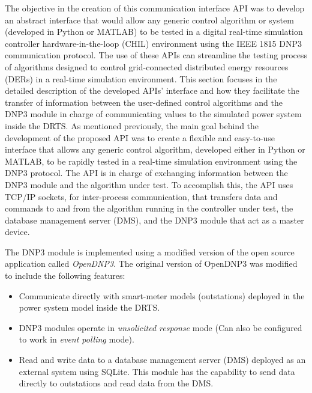 The objective in the creation of this communication interface API was to develop an abstract interface that would allow any generic control algorithm or system (developed in Python or MATLAB) to be tested in a digital real-time simulation controller hardware-in-the-loop (CHIL) environment using the IEEE 1815 DNP3 communication protocol. The use of these APIs can streamline the testing process of algorithms designed to control grid-connected distributed energy resources (DERs) in a real-time simulation environment. This section focuses in the detailed description of the developed APIs' interface and how they facilitate the transfer of information between the user-defined control algorithms and the DNP3 module in charge of communicating values to the simulated power system inside the DRTS.
As mentioned previously, the main goal behind the development of the proposed API was to create a flexible and easy-to-use interface that allows any generic control algorithm, developed either in Python or MATLAB, to be rapidly tested in a real-time simulation environment using the DNP3 protocol. The API is in charge of exchanging information between the DNP3 module and the algorithm under test. To accomplish this, the API uses TCP/IP sockets, for inter-process communication, that transfers data and commands to and from the algorithm running in the controller under test, the database management server (DMS), and the DNP3 module that act as a master device. 



The DNP3 module is implemented using a modified version of the open source application called \textit{OpenDNP3}. The original version of OpenDNP3 was modified to include the following features:

\begin{itemize}
    \item Communicate directly with smart-meter models (outstations) deployed in the power system model inside the DRTS. 
    
    \item DNP3 modules operate in \textit{unsolicited response} mode (Can also be configured to work in \textit{event polling} mode). 
    
    \item Read and write data to a database management server (DMS) deployed as an external system using SQLite. This module has the capability to send data directly to outstations and read data from the DMS.
\end{itemize}

